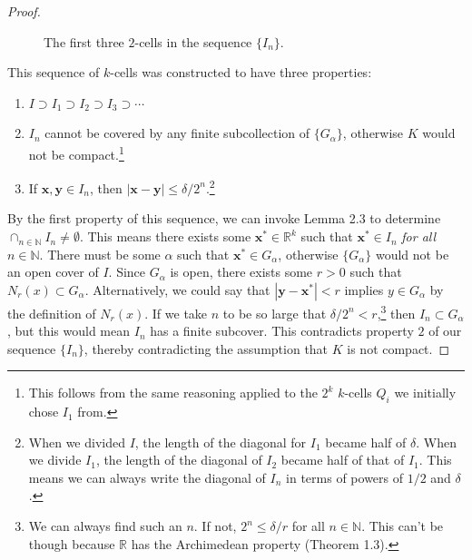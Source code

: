 \documentclass{article}
\newcommand{\N}{\mathbb{N}}
\newcommand{\R}{\mathbb{R}}
\newcommand{\x}{\mathbf{x}}
\newcommand{\y}{\mathbf{y}}
\theoremstyle{definition}
\begin{document}
\begin{proof}
\begin{figure}[h!]
	\caption{The first three $ 2 $-cells in the sequence $ \{I_n\} $.}
\end{figure}
This sequence of $ k $-cells was constructed to have three properties:
\begin{enumerate}
	\item $ I\supset I_1\supset I_2\supset I_3\supset\cdots $
	\item $ I_n $ cannot be covered by any finite subcollection of $ \{G_\alpha\} $, otherwise $ K $ would not be compact.\footnote{This follows from the same reasoning applied to the $ 2^k $ $ k $-cells $ Q_i $ we initially chose $ I_1 $ from.}
	\item If $ \x,\y\in I_n $, then $ |\x-\y|\le \delta/2^n $.\footnote{When we divided $ I $, the length of the diagonal for $ I_1 $ became half of $ \delta $. When we divide $ I_1 $, the length of the diagonal of $ I_2 $ became half of that of $ I_1 $. This means we can always write the diagonal of $ I_n $ in terms of powers of $ 1/2 $ and $ \delta $.  }
\end{enumerate}
By the first property of this sequence, we can invoke Lemma 2.3 to determine $ \cap_{n\in\N} I_n\neq\emptyset $. This means there exists some $ \x^*\in\R^k $ such that $ \x^*\in I_n $ \textit{for all} $ n\in\N $. There must be some $ \alpha $ such that $ \x^*\in G_\alpha $, otherwise $ \{G_\alpha\} $ would not be an open cover of $ I $. Since $ G_\alpha $ is open, there exists some $ r>0 $ such that $ N_r(x)\subset G_\alpha $. Alternatively, we could say that $ |\y-\x^*|<r $ implies $ y\in G_\alpha $ by the definition of $ N_r(x) $. If we take $ n $ to be so large that $ \delta/2^n<r $,\footnote{We can always find such an $ n $. If not, $ 2^n\le\delta /r $ for all $ n \in\N$. This can't be though because $ \R $ has the Archimedean property (Theorem 1.3).} then $ I_n\subset G_\alpha $, but this would mean $ I_n $ has a finite subcover. This contradicts property $ 2 $ of our sequence $ \{I_n\} $, thereby contradicting the assumption that $ K $ is not compact. 
\end{proof}
\end{document}
